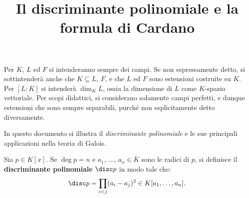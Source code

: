 \documentclass[12pt]{scrartcl}
\begin{document}
	\title{Il discriminante polinomiale e la formula di Cardano}
	\maketitle
	
	\begin{note}
		Per $K$, $L$ ed $F$ si intenderanno sempre dei campi.
		Se non espressamente detto, si sottintenderà anche
		che $K \subseteq L$, $F$, e che $L$ ed $F$ sono
		estensioni costruite su $K$. Per $[L : K]$ si
		intenderà $\dim_K L$, ossia la dimensione di $L$
		come $K$-spazio vettoriale. Per scopi didattici, si
		considerano solamente campi perfetti, e dunque estensioni che sono sempre separabili, purché
		non esplicitamente detto diversamente.
	\end{note} \bigskip
	
	In questo documento si illustra il \textit{discriminante polinomiale} e
	le sue principali applicazioni nella teoria di Galois.
	
	\begin{definition}
		Sia $p \in K[x]$. Se $\deg p = n$ e $a_1$, ..., $a_n \in \overline{K}$ sono le radici
		di $p$, si definisce il \textbf{discriminante polinomiale} $\disc p$ in modo
		tale che:
		\[ \disc p = \prod_{i < j} (a_i - a_j)^2 \in K[a_1, \ldots, a_n]. \]
	\end{definition}
	
\end{document}
